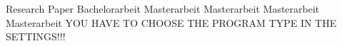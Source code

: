 \begin{center}

\vspace{1cm}

\begin{minipage}[t][5cm][s]{\textwidth}%
\centering
\Huge{{\color{FH2}{\fontsize{24}{30} \selectfont \workTitle\\}}}
\vspace{0.5cm}
\LARGE{{\color{FH2}{\fontsize{16}{24} \selectfont \subTitle\\}}}
\end{minipage}

\vspace{1cm}


\ifnum{}
\else{}
\fi{} 
   	\LARGE{Research Paper}
\else
	\ifnum{}
	\else{}
\fi{}
	\LARGE{Bachelorarbeit}
\else
	\ifuseMasterInteractiveTechnologies
		\LARGE{Masterarbeit}
	\else
	\ifuseMasterDigitalDesign
		\LARGE{Masterarbeit}
	\else
    \ifuseMasterDigitalMediaProduction
		\LARGE{Masterarbeit}
	\else
	\ifuseMasterDigitalHealthCare
		\LARGE{Masterarbeit}
    \else
        \LARGE{YOU HAVE TO CHOOSE THE PROGRAM TYPE IN THE SETTINGS!!!}
    \fi\fi\fi\fi
\fi\fi






\end{center}

